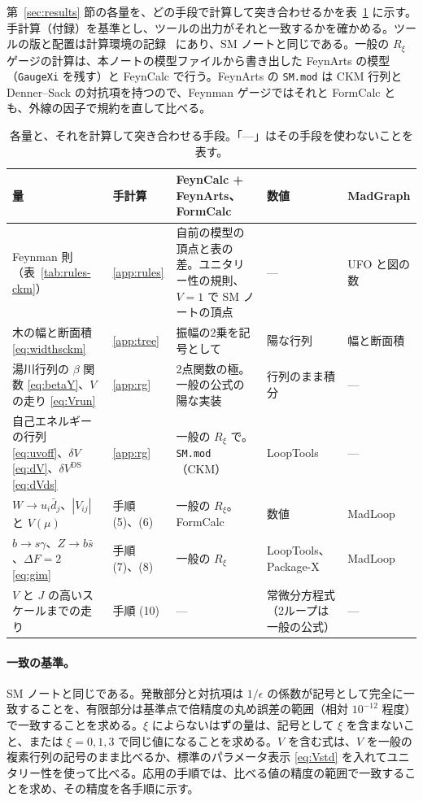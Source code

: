 \documentclass[a4paper,10pt]{ltjsarticle}
\begin{document}
第~\ref{sec:results} 節の各量を、どの手段で計算して突き合わせるかを表~\ref{tab:plan} に示す。手計算（付録）を基準とし、ツールの出力がそれと一致するかを確かめる。ツールの版と配置は計算環境の記録~\cite{env} にあり、SM ノートと同じである。一般の $R_\xi$ ゲージの計算は、本ノートの模型ファイルから書き出した FeynArts の模型（\texttt{GaugeXi} を残す）と FeynCalc で行う。FeynArts の \texttt{SM.mod} は CKM 行列と Denner--Sack の対抗項を持つので、Feynman ゲージではそれと FormCalc とも、外線の因子で規約を直して比べる。

\begin{table}[tbp]
\centering\small
\caption{各量と、それを計算して突き合わせる手段。「—」はその手段を使わないことを表す。}
\label{tab:plan}
\begin{tabularx}{\linewidth}{>{\raggedright\arraybackslash}p{3.4cm}>{\raggedright\arraybackslash}p{1.3cm}>{\raggedright\arraybackslash}X>{\raggedright\arraybackslash}p{1.9cm}>{\raggedright\arraybackslash}p{2.1cm}}
\toprule
\textbf{量} & \textbf{手計算} & \textbf{FeynCalc + FeynArts、FormCalc} & \textbf{数値} & \textbf{MadGraph} \\
\midrule
Feynman 則（表~\ref{tab:rules-ckm}） & \ref{app:rules} & 自前の模型の頂点と表の差。ユニタリー性の規則、$V=1$ で SM ノートの頂点 & — & UFO と図の数 \\
木の幅と断面積 \eqref{eq:widthsckm} & \ref{app:tree} & 振幅の2乗を記号として & 陽な行列 & 幅と断面積 \\
湯川行列の $\beta$ 関数 \eqref{eq:betaY}、$V$ の走り \eqref{eq:Vrun} & \ref{app:rg} & 2点関数の極。一般の公式の陽な実装 & 行列のまま積分 & — \\
自己エネルギーの行列 \eqref{eq:uvoff}、$\delta V$ \eqref{eq:dV}、$\delta V^{\mathrm{DS}}$ \eqref{eq:dVds} & \ref{app:rg} & 一般の $R_\xi$ で。\texttt{SM.mod}（CKM） & LoopTools & — \\
$W\to u_i\bar d_j$、$|V_{ij}|$ と $V(\mu)$ & 手順 (5)、(6) & 一般の $R_\xi$。FormCalc & 数値 & MadLoop \\
$b\to s\gamma$、$Z\to b\bar s$、$\Delta F=2$ \eqref{eq:gim} & 手順 (7)、(8) & 一般の $R_\xi$ & LoopTools、Package-X & MadLoop \\
$V$ と $J$ の高いスケールまでの走り & 手順 (10) & — & 常微分方程式（2ループは一般の公式） & — \\
\bottomrule
\end{tabularx}
\end{table}

\paragraph{一致の基準。}SM ノートと同じである。発散部分と対抗項は $1/\epsilon$ の係数が記号として完全に一致することを、有限部分は基準点で倍精度の丸め誤差の範囲（相対 $10^{-12}$ 程度）で一致することを求める。$\xi$ によらないはずの量は、記号として $\xi$ を含まないこと、または $\xi=0,1,3$ で同じ値になることを求める。$V$ を含む式は、$V$ を一般の複素行列の記号のまま比べるか、標準のパラメータ表示 \eqref{eq:Vstd} を入れてユニタリー性を使って比べる。応用の手順では、比べる値の精度の範囲で一致することを求め、その精度を各手順に示す。
\end{document}
